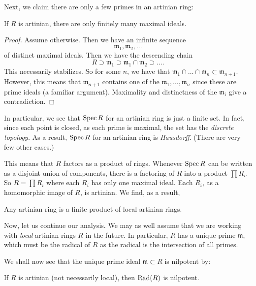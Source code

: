 Next, we claim there are only a few primes in an artinian ring:
\begin{lemma} 
If $R$ is artinian, there are only finitely many maximal ideals.
\end{lemma} 
\begin{proof} 
Assume otherwise. Then we have an infinite sequence
\[ \mathfrak{m}_1,  \mathfrak{m}_2, \dots  \]
of distinct maximal ideals. Then we have the descending chain
\[ R \supset \mathfrak{m}_1 \supset \mathfrak{m}_1 \cap \mathfrak{m}_2 \supset \dots.  \]
This necessarily stabilizes. So for some $n$, we have that $\mathfrak{m}_1 \cap \dots \cap 
\mathfrak{m}_n \subset \mathfrak{m}_{n+1}$. However, this means that
$\mathfrak{m}_{n+1}$ contains one of the $\mathfrak{m}_1, \dots,
\mathfrak{m}_n$ since these are prime ideals (a familiar argument).  Maximality
and distinctness of the $\mathfrak{m}_i$ give a contradiction.
\end{proof} 

In particular, we see that $\operatorname{Spec} R$ for an artinian ring is just a finite set.
In fact, since each point is closed, as each prime is maximal, the set has the
\emph{discrete topology.} As a result, $\operatorname{Spec} R$ for an artinian ring is
\emph{Hausdorff}. (There are very few other cases.)

This means that $R$ factors as a product of rings. Whenever $\operatorname{Spec} R$ can be
written as a disjoint union of components, there is a factoring of $R$ into a
product $\prod R_i$. So $R = \prod R_i$ where each $R_i$ has
only one maximal ideal. Each $R_i$, as a homomorphic image of $R$, is artinian. We find, as a result, 


\begin{proposition} 
Any artinian ring is a finite product of local artinian rings.
\end{proposition} 

Now, let us continue our analysis. We may as well assume that we are working
with \emph{local} artinian rings $R$ in the future. In particular, $R$ has a unique
prime $\mathfrak{m}$, which must be the radical of $R$ as the radical is the
intersection of all primes. 

We shall now see that the unique prime ideal $\mathfrak{m} \subset R$ is
nilpotent by:
\begin{lemma} \label{radnilpotentartinian}
If $R$ is artinian (not necessarily local), then $\operatorname{Rad} (R) $ is nilpotent.
\end{lemma} 


